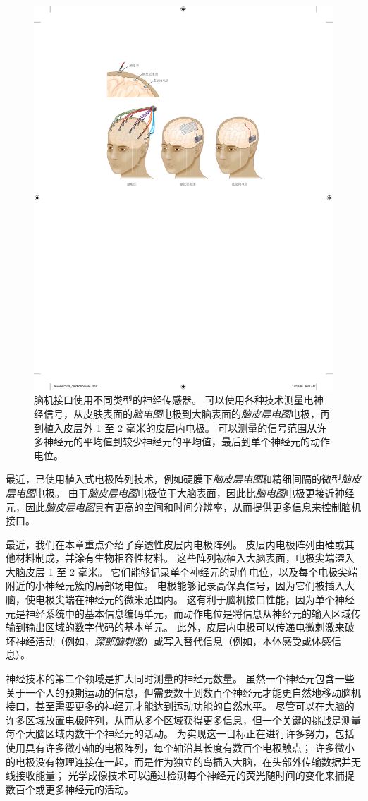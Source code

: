 \begin{figure}[htbp]
	\centering
	\includegraphics[width=0.5\linewidth]{chap39/fig_39_2}
	\caption{脑机接口使用不同类型的神经传感器。 
		可以使用各种技术测量电神经信号，从皮肤表面的\textit{脑电图}电极到大脑表面的\textit{脑皮层电图}电极，再到植入皮层外 1 至 2 毫米的皮层内电极。 
		可以测量的信号范围从许多神经元的平均值到较少神经元的平均值，最后到单个神经元的动作电位\cite{blabe2015assessment}。}
	\label{fig:39_2}
\end{figure}


最近，已使用植入式电极阵列技术，例如硬膜下\textit{脑皮层电图}和精细间隔的微型\textit{脑皮层电图}电极。
由于\textit{脑皮层电图}电极位于大脑表面，因此比\textit{脑电图}电极更接近神经元，因此\textit{脑皮层电图}具有更高的空间和时间分辨率，从而提供更多信息来控制脑机接口。


最近，我们在本章重点介绍了穿透性皮层内电极阵列。
皮层内电极阵列由硅或其他材料制成，并涂有生物相容性材料。
这些阵列被植入大脑表面，电极尖端深入大脑皮层 1 至 2 毫米。
它们能够记录单个神经元的动作电位，以及每个电极尖端附近的小神经元簇的局部场电位。
电极能够记录高保真信号，因为它们被插入大脑，使电极尖端在神经元的微米范围内。
这有利于脑机接口性能，因为单个神经元是神经系统中的基本信息编码单元，而动作电位是将信息从神经元的输入区域传输到输出区域的数字代码的基本单元。
此外，皮层内电极可以传递电微刺激来破坏神经活动（例如，\textit{深部脑刺激}）或写入替代信息（例如，本体感受或体感信息）。


神经技术的第二个领域是扩大同时测量的神经元数量。 
虽然一个神经元包含一些关于一个人的预期运动的信息，但需要数十到数百个神经元才能更自然地移动脑机接口，甚至需要更多的神经元才能达到运动功能的自然水平。
尽管可以在大脑的许多区域放置电极阵列，从而从多个区域获得更多信息，但一个关键的挑战是测量每个大脑区域内数千个神经元的活动。
为实现这一目标正在进行许多努力，包括使用具有许多微小轴的电极阵列，每个轴沿其长度有数百个电极触点； 许多微小的电极没有物理连接在一起，而是作为独立的岛插入大脑，在头部外传输数据并无线接收能量；
光学成像技术可以通过检测每个神经元的荧光随时间的变化来捕捉数百个或更多神经元的活动。


